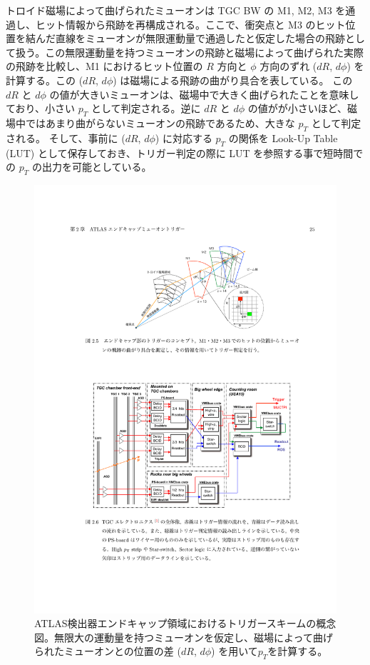 トロイド磁場によって曲げられたミューオンは TGC BW の M1, M2, M3 を通過し、ヒット情報から飛跡を再構成される。ここで、衝突点と M3 のヒット位置を結んだ直線をミューオンが無限運動量で通過したと仮定した場合の飛跡として扱う。この無限運動量を持つミューオンの飛跡と磁場によって曲げられた実際の飛跡を比較し、M1 におけるヒット位置の $R$ 方向と $\phi$ 方向のずれ ($dR$, $d\phi$) を計算する。この ($dR$, $d\phi$) は磁場による飛跡の曲がり具合を表している。
この $dR$ と $d\phi$ の値が大きいミューオンは、磁場中で大きく曲げられたことを意味しており、小さい $p_T$ として判定される。逆に $dR$ と $d\phi$ の値がが小さいほど、磁場中ではあまり曲がらないミューオンの飛跡であるため、大きな $p_T$ として判定される。
そして、事前に ($dR$, $d\phi$) に対応する $p_T$ の関係を Look-Up Table (LUT) として保存しておき、トリガー判定の際に LUT を参照する事で短時間での $p_T$ の出力を可能としている。

\begin{figure}[tb]
  \centering
  \includegraphics[clip, width=15cm]{fig/3/akatsuka_mt_trigger_scheme.pdf}
  \caption{ATLAS検出器エンドキャップ領域におけるトリガースキームの概念図\cite{article:akatsuka-mron}。無限大の運動量を持つミューオンを仮定し、磁場によって曲げられたミューオンとの位置の差 ($dR$, $d\phi$) を用いて$p_T$を計算する。}
  \label{fig:trigger-scheme}
\end{figure}

